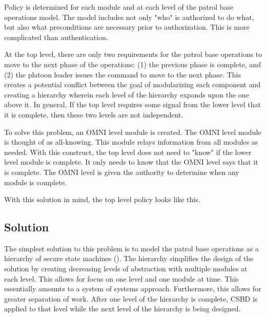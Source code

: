 \documentclass[../../main/main.tex]{subfiles}
\begin{document}
Policy is determined for each module and at each level of the patrol base operations model.  The model includes not only "who" is authorized to do what, but also what preconditions are necessary prior to authorization.  This is more complicated than authentication.

At the top level, there are only two requirements for the patrol base operations to move to the next phase of the operations: (1) the previous phase is complete, and (2) the platoon leader issues the command to move to the next phase.  This creates a potential conflict between the goal of modularizing each component and creating a hierarchy wherein each level of the hierarchy expands upon the one above it.  In general, If the top level requires some signal from the lower level that it is complete, then these two levels are not independent. 

To solve this problem, an OMNI level module is created.  The OMNI level module is thought of as all-knowing.  This module relays information from all modules as needed.  With this construct, the top level does not need to "know" if the lower level module is complete.  It only needs to know that the OMNI level says that it is complete.  The OMNI level is given the authority to determine when any module is complete.

With this solution in mind, the top level policy looks like this.



\subsection{Solution}
The simplest solution to this problem is to model the patrol base operations as a hierarchy of secure state machines ().  The hierarchy simplifies the design of the solution by creating decreasing levels of abstraction with multiple modules at each level.  This allows for focus on one level and one module at time. This essentially amounts to a system of systems approach.  Furthermore, this allows for greater separation of work.  After one level of the hierarchy is complete, CSBD is applied to that level while the next level of the hierarchy is being designed.
\end{document}
